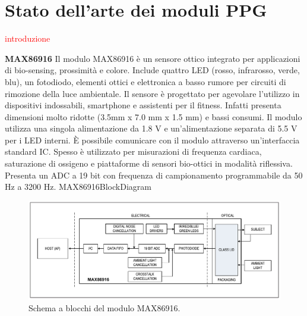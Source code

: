 \section{Stato dell'arte dei moduli PPG}
\textcolor{red}{introduzione}

\textbf{MAX86916} Il modulo MAX86916 è un sensore ottico integrato per applicazioni di bio-sensing, prossimità e colore\cite{Integrated}. Include quattro LED (rosso, infrarosso, verde, blu), un fotodiodo, elementi ottici e elettronica a basso rumore per circuiti di rimozione della luce ambientale. Il sensore è progettato per agevolare l'utilizzo in dispositivi indossabili, smartphone e assistenti per il fitness. Infatti presenta dimensioni molto ridotte (3.5mm x 7.0 mm x 1.5 mm) e bassi consumi. Il modulo utilizza una singola alimentazione da 1.8 V e un'alimentazione separata di 5.5 V per i LED interni. \`E possibile comunicare con il modulo attraverso un'interfaccia standard IC. Spesso è utilizzato per misurazioni di frequenza cardiaca, saturazione di ossigeno e piattaforme di sensori bio-ottici in modalità riflessiva. Presenta un ADC a 19 bit con frequenza di campionamento programmabile da 50 Hz a 3200 Hz.
MAX86916BlockDiagram
\begin{figure}[h]
	\centering
	\includegraphics[width=1\linewidth]{ImageFiles/Fotopletismografia/MAX86916BlockDiagram}
	\caption{Schema a blocchi del modulo MAX86916.}
	\label{fig:MAX86916BlockDiagram}
\end{figure}